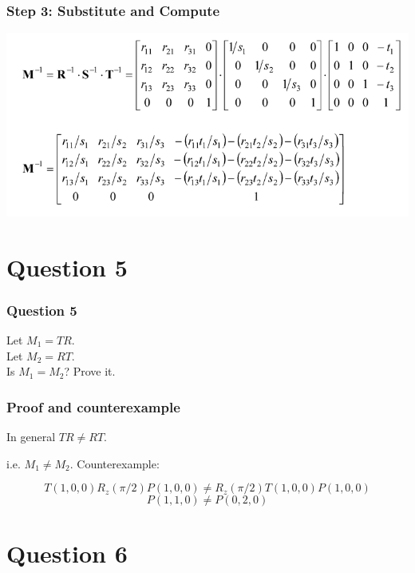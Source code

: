 \documentclass{beamer}
\begin{document}
\begin{frame}
    \frametitle{Step 3: Substitute and Compute}

    \begin{center}
        \includegraphics[scale=0.6]{q4.png}
    \end{center}

\end{frame}

\section{Question 5}

\begin{frame}
    \frametitle{Question 5}
    
    Let $M_1 = TR$. \\
    Let $M_2 = RT$. \\
    Is $M_1 = M_2$? Prove it.

\end{frame}

\begin{frame}
    \frametitle{Proof and counterexample}

    \begin{tcolorbox}
        In general $TR \neq RT$.
    \end{tcolorbox}

    i.e. $M_1 \neq M_2$. Counterexample:

    $$T(1, 0, 0) R_z(\pi/2) P(1, 0, 0) \neq R_z(\pi/2) T(1, 0, 0) P(1, 0, 0)$$
    $$P(1, 1, 0) \neq P(0, 2, 0)$$

\end{frame}

\section{Question 6}
\end{document}
